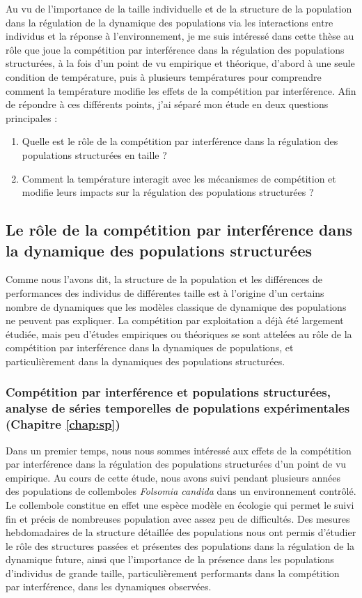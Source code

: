 Au vu de l'importance de la taille individuelle et de la structure de la
population dans la régulation de la dynamique des populations via les
interactions entre individus et la réponse à l'environnement, je me suis
intéressé dans cette thèse au rôle que joue la compétition par interférence dans
la régulation des populations structurées, à la fois d'un point de vu empirique
et théorique, d'abord à une seule condition de température, puis à plusieurs
températures pour comprendre comment la température modifie les effets de la
compétition par interférence. Afin de répondre à ces différents points, j'ai
séparé mon étude en deux questions principales :
\begin{enumerate}
  \item Quelle est le rôle de la compétition par interférence dans la régulation
  des populations structurées en taille ?
  \item Comment la température interagit avec les mécanismes de compétition et
  modifie leurs impacts sur la régulation des populations structurées ?
\end{enumerate}

\subsection{Le rôle de la compétition par interférence dans la dynamique des
populations structurées}

Comme nous l'avons dit, la structure de la population et les différences de
performances des individus de différentes taille est à l'origine d'un certains
nombre de dynamiques que les modèles classique de dynamique des populations ne
peuvent pas expliquer. La compétition par exploitation a déjà été largement
étudiée, mais peu d'études empiriques ou théoriques se sont attelées au rôle de
la compétition par interférence dans la dynamiques de populations, et
particulièrement dans la dynamiques des populations structurées.

\subsubsection{Compétition par interférence et populations structurées,
analyse de séries temporelles de populations expérimentales (Chapitre \ref{chap:sp})}

Dans un premier temps, nous nous sommes intéressé aux effets de la compétition
par interférence dans la régulation des populations structurées d'un point de vu
empirique. Au cours de cette étude, nous avons suivi pendant plusieurs années
des populations de collemboles \textit{Folsomia candida} dans un environnement
contrôlé. Le collembole constitue en effet une espèce modèle en écologie
\autocites{fountain2005a} qui permet le suivi fin et précis de nombreuses
population avec assez peu de difficultés. Des mesures hebdomadaires de la
structure détaillée des populations nous ont permis d'étudier le rôle des
structures passées et présentes des populations dans la régulation de la
dynamique future, ainsi que l'importance de la présence dans les populations
d'individus de grande taille, particulièrement performants dans la compétition par interférence, dans les
dynamiques observées. 

